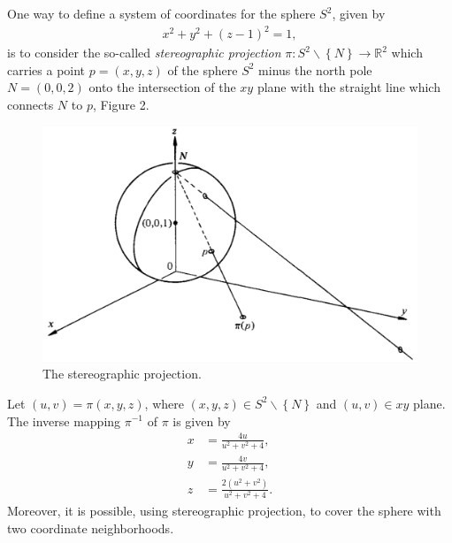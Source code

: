 \documentclass[a4paper]{article}
\numberwithin{equation}{section}
\begin{document}
One way to define a system of coordinates for the sphere $S^2$, given by
\begin{align}
\label{3.1}
{x^2} + {y^2} + {\left( {z - 1} \right)^2} = 1,
\end{align}
is to consider the so-called \textit{stereographic projection} $\pi :{S^2}\backslash \left\{ N \right\} \to {\mathbb{R}^2}$ which carries a point $p=\left(x,y,z\right)$ of the sphere $S^2$ minus the north pole $N=\left(0,0,2\right)$ onto the intersection of the $xy$ plane with the straight line which connects $N$ to $p$, Figure 2.
\begin{figure}[H]
\includegraphics[scale=0.4]{4}
\caption{The stereographic projection.}
\end{figure}
Let $\left(u,v\right)=\pi \left(x,y,z\right)$, where $\left( {x,y,z} \right) \in {S^2}\backslash \left\{ N \right\}$ and $\left(u,v\right)\in xy$ plane. The inverse mapping $\pi ^{-1}$ of $\pi$ is given by
\begin{align}
x &= \frac{{4u}}{{{u^2} + {v^2} + 4}},\\
y &= \frac{{4v}}{{{u^2} + {v^2} + 4}},\\
z &= \frac{{2\left( {{u^2} + {v^2}} \right)}}{{{u^2} + {v^2} + 4}}.
\end{align}
Moreover, it is possible, using stereographic projection, to cover the sphere with two coordinate neighborhoods.
\end{document}
